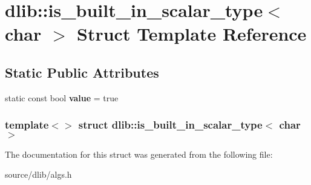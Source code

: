 \hypertarget{structdlib_1_1is__built__in__scalar__type_3_01char_01_4}{
\section{dlib::is\_\-built\_\-in\_\-scalar\_\-type$<$ char $>$ Struct Template Reference}
\label{structdlib_1_1is__built__in__scalar__type_3_01char_01_4}
}
\subsection*{Static Public Attributes}
\begin{DoxyCompactItemize}
\item 
\hypertarget{structdlib_1_1is__built__in__scalar__type_3_01char_01_4_a44f76ad3840e087faa28e5d05a2c491b}{
static const bool {\bfseries value} = true}
\label{structdlib_1_1is__built__in__scalar__type_3_01char_01_4_a44f76ad3840e087faa28e5d05a2c491b}

\end{DoxyCompactItemize}
\subsubsection*{template$<$$>$ struct dlib::is\_\-built\_\-in\_\-scalar\_\-type$<$ char $>$}



The documentation for this struct was generated from the following file:\begin{DoxyCompactItemize}
\item 
source/dlib/algs.h\end{DoxyCompactItemize}
